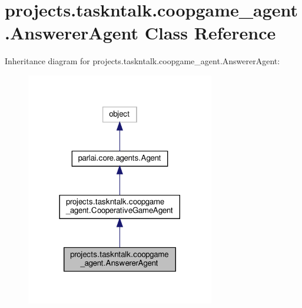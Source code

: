 \hypertarget{classprojects_1_1taskntalk_1_1coopgame__agent_1_1AnswererAgent}{}\section{projects.\+taskntalk.\+coopgame\+\_\+agent.\+Answerer\+Agent Class Reference}
\label{classprojects_1_1taskntalk_1_1coopgame__agent_1_1AnswererAgent}


Inheritance diagram for projects.\+taskntalk.\+coopgame\+\_\+agent.\+Answerer\+Agent\+:
\nopagebreak
\begin{figure}[H]
\begin{center}
\leavevmode
\includegraphics[width=233pt]{d1/d93/classprojects_1_1taskntalk_1_1coopgame__agent_1_1AnswererAgent__inherit__graph}
\end{center}
\end{figure}


